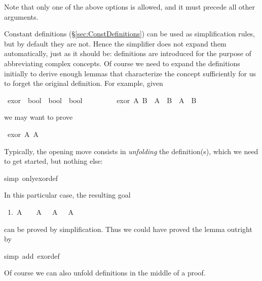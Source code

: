 \begin{isabellebody}
\begin{isamarkuptext}
Note that only one of the above options is allowed, and it must precede all
other arguments.%
\end{isamarkuptext}%
%
%
\begin{isamarkuptext}%
Constant definitions (\S\ref{sec:ConstDefinitions}) can
be used as simplification rules, but by default they are not.  Hence the
simplifier does not expand them automatically, just as it should be:
definitions are introduced for the purpose of abbreviating complex
concepts. Of course we need to expand the definitions initially to derive
enough lemmas that characterize the concept sufficiently for us to forget the
original definition. For example, given%
\end{isamarkuptext}%
\ exor\ {\isacharcolon}{\isacharcolon}\ {\isachardoublequote}bool\ {\isasymRightarrow}\ bool\ {\isasymRightarrow}\ bool{\isachardoublequote}\isanewline
\ \ \ \ \ \ \ \ \ {\isachardoublequote}exor\ A\ B\ {\isasymequiv}\ {\isacharparenleft}A\ {\isasymand}\ {\isasymnot}B{\isacharparenright}\ {\isasymor}\ {\isacharparenleft}{\isasymnot}A\ {\isasymand}\ B{\isacharparenright}{\isachardoublequote}%
\begin{isamarkuptext}%
\noindent
we may want to prove%
\end{isamarkuptext}%
\ {\isachardoublequote}exor\ A\ {\isacharparenleft}{\isasymnot}A{\isacharparenright}{\isachardoublequote}%
\begin{isamarkuptxt}%
\noindent
Typically, the opening move consists in \emph{unfolding} the definition(s), which we need to
get started, but nothing else:%
\end{isamarkuptxt}%
simp\ only{\isacharcolon}exor{\isacharunderscore}def{\isacharparenright}%
\begin{isamarkuptxt}%
\noindent
In this particular case, the resulting goal
\begin{isabelle}
~1.~A~{\isasymand}~{\isasymnot}~{\isasymnot}~A~{\isasymor}~{\isasymnot}~A~{\isasymand}~{\isasymnot}~A%
\end{isabelle}
can be proved by simplification. Thus we could have proved the lemma outright by%
\end{isamarkuptxt}%
simp\ add{\isacharcolon}\ exor{\isacharunderscore}def{\isacharparenright}%
\begin{isamarkuptext}%
\noindent
Of course we can also unfold definitions in the middle of a proof.


\end{isamarkuptext}
\end{isabellebody}
